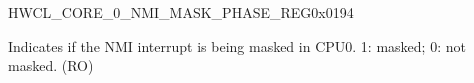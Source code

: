 \begin{register}{H}{WCL\_CORE\_0\_NMI\_MASK\_PHASE\_REG}{0x{}0194}\label{regdesc:WCLCORE0NMIMASKPHASEREG}
%
%
\regnewline%
\begin{regdesc}\begin{reglist}
\label{fielddesc:WCLCORE0NMIMASKPHASE}\item [WCL\_CORE\_0\_NMI\_MASK\_PHASE] Indicates if the NMI interrupt is being masked in CPU0. 1: masked; 0: not masked. (RO)
\end{reglist}\end{regdesc}
\end{register}




























































